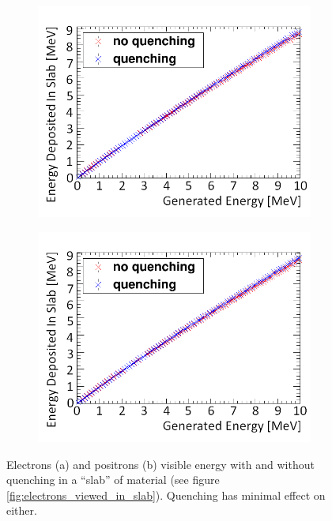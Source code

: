 \begin{figure}[!h]
\centering
\begin{subfigure}{.45\textwidth}
  \centering
  \includegraphics[width=\linewidth]{Chapter4/Figs/Raster/quenchedElectronsNew.png}
  \captionsetup{width=.9\linewidth}
  \caption{}
  \label{subFig:electron_quenched_and_not}
\end{subfigure}%
\begin{subfigure}{.45\textwidth}
  \centering
  \includegraphics[width=\linewidth]{Chapter4/Figs/Raster/quenchedPositronsNew.png}
  \captionsetup{width=.9\linewidth}
  \caption{}
  \label{subFig:positron_quenched_and_not}
\end{subfigure}
\caption[Electron and positron visible energy in a slab of scintillator.]{Electrons (a) and positrons (b) visible energy with and without quenching in a ``slab'' of material (see figure \ref{fig:electrons_viewed_in_slab}). Quenching has minimal effect on either. }
\label{fig:electron_positron_quenched_and_not}
\end{figure}

